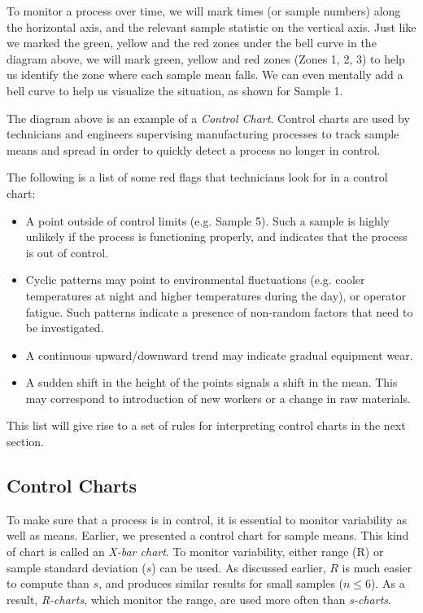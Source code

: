 \documentclass{ximera}
\begin{document}
To monitor a process over time, we will mark times (or sample numbers) along the horizontal axis, and the relevant sample statistic on the vertical axis.  Just like we marked the green, yellow and the red zones under the bell curve in the diagram above, we will mark green, yellow and red zones (Zones 1, 2, 3) to help us identify the zone where each sample mean falls.  We can even mentally add a bell curve to help us visualize the situation, as shown for Sample 1.

\begin{onlineOnly}
\begin{center}
\end{center}
\end{onlineOnly}

The diagram above is an example of a \emph{Control Chart}.  Control charts are used by technicians and engineers supervising manufacturing processes to track sample means and spread in order to quickly detect a process no longer in control.  

The following is a list of some red flags that technicians look for in a control chart:
\begin{itemize}
    \item A point outside of control limits (e.g. Sample 5).  Such a sample is highly unlikely if the process is functioning properly, and indicates that the process is out of control.
    \item Cyclic patterns may point to environmental fluctuations (e.g. cooler temperatures at night and higher temperatures during the day), or operator fatigue.  Such patterns indicate a presence of non-random factors that need to be investigated.  
    \item A continuous upward/downward trend may indicate gradual equipment wear.
    \item A sudden shift in the height of the points signals a shift in the mean.  This may correspond to introduction of new workers or a change in raw materials.
\end{itemize}
This list will give rise to a set of rules for interpreting control charts in the next section.

\subsection*{Control Charts}

To make sure that a process is in control, it is essential to monitor variability as well as means.  Earlier, we presented a control chart for sample means.  This kind of chart is called an \emph{X-bar chart}.  To monitor variability, either range (R) or sample standard deviation ($s$) can be used.  As discussed earlier, $R$ is much easier to compute than $s$, and produces similar results for small samples ($n\leq 6$).  As a result, \emph{R-charts}, which monitor the range, are used more often than \emph{s-charts}.
\end{document}
